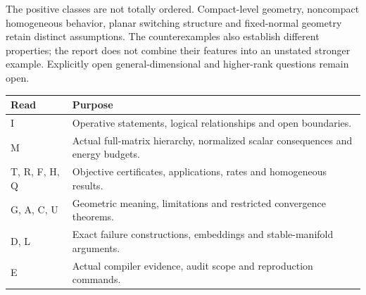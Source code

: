 \documentclass[10pt,oneside,openany]{book}
\theoremstyle{remark}\newtheorem{remark}{Remark}[chapter]
\begin{document}
The positive classes are not totally ordered. Compact-level geometry, noncompact homogeneous behavior, planar switching structure and fixed-normal geometry retain distinct assumptions. The counterexamples also establish different properties; the report does not combine their features into an unstated stronger example. Explicitly open general-dimensional and higher-rank questions remain open.

\begin{center}
\begin{tabular}{p{}p{}}
\toprule Read & Purpose\\\midrule
I & Operative statements, logical relationships and open boundaries.\\
M & Actual full-matrix hierarchy, normalized scalar consequences and energy budgets.\\
T, R, F, H, Q & Objective certificates, applications, rates and homogeneous results.\\
G, A, C, U & Geometric meaning, limitations and restricted convergence theorems.\\
D, L & Exact failure constructions, embeddings and stable-manifold arguments.\\
E & Actual compiler evidence, audit scope and reproduction commands.\\\bottomrule
\end{tabular}
\end{center}

\tableofcontents\mainmatter
\end{document}
